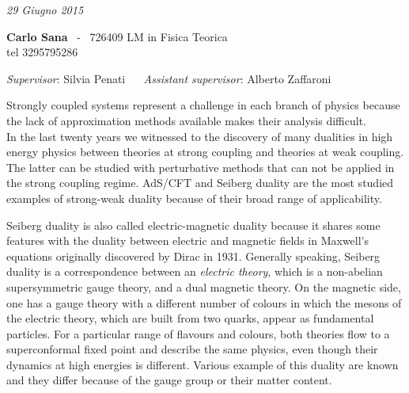 \documentclass[a4paper,12pt]{article}
\date{}
\title{ \textbf{\boldmath{4D to 3D reduction of Seiberg duality for $SU(N)$ susy gauge theories with adjoint matter: a partition function approach }}	}
\author{}
\begin{document}
\maketitle
\vspace*{-2.3cm}
\begin{center}
\textit {29 Giugno 2015} \\
 \end{center}
\vspace{-0.3cm}
	 \textbf{Carlo Sana}  ~-~ 726409  \hfill
 LM in Fisica Teorica 
\\
 \hspace{2cm} tel   3295795286\\
\vspace{-0.5cm}
\begin{center}
\textit{Supervisor}: 
\textsf{Silvia Penati} 
~~
\textit{Assistant supervisor}:
\textsf{Alberto Zaffaroni}

\end{center}



Strongly coupled systems represent a challenge in each branch of physics because the lack of approximation methods available makes their analysis difficult.\\
In the last twenty years we witnessed to the discovery of many dualities in high energy physics between theories at strong coupling and theories at weak coupling.
The latter can be studied with perturbative methods that can not be applied in the strong coupling regime.
AdS/CFT and Seiberg duality are the most studied examples of strong-weak duality because of their broad range of applicability.

Seiberg duality is also called electric-magnetic duality because it shares some features with the duality between electric and magnetic fields in Maxwell's equations originally discovered by Dirac in 1931.
Generally speaking, Seiberg duality is a correspondence between an \emph{electric theory}, which is a non-abelian supersymmetric gauge theory, and a dual magnetic theory. 
On the magnetic side, one has a gauge theory with a different number of colours  in which the mesons of the electric theory, which are built from two quarks, appear as fundamental particles.
For a particular range of flavours and colours, both theories flow to a superconformal fixed point and describe the same physics, even though their dynamics at high energies is different.
Various example of this duality are known and they differ because of the gauge group or their matter content.
\end{document}
